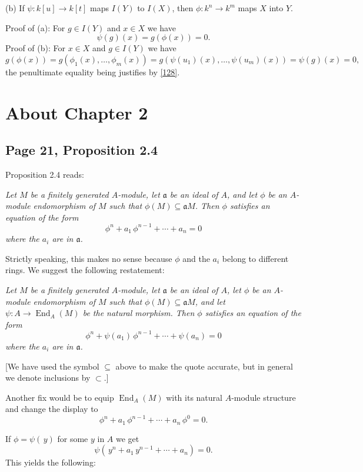 \documentclass[parskip=half,fontsize=12pt]{scrartcl}%
\newcommand{\oo}{\operatorname}\newcommand{\ooo}{\operatorname*}
\newcommand{\mf}{\mathfrak}
\newcommand{\aaa}{\mf a}
\begin{document}
(b) If $\psi:k[u]\to k[t]$ maps $I(Y)$ to $I(X)$, then $\phi:k^n\to k^m$ maps $X$ into $Y$. 

Proof of (a): For $g\in I(Y)$ and $x\in X$ we have 
$$
\psi(g)(x)=g(\phi(x))=0.
$$ 
Proof of (b): For $x\in X$ and $g\in I(Y)$ we have 
$$
g(\phi(x))=g(\phi_1(x),\dots,\phi_m(x))=g(\psi(u_1)(x),\dots,\psi(u_m)(x))=\psi(g)(x)=0,
$$ 
the penultimate equality being justifies by \eqref{128}.


\section{About Chapter 2}%

\subsection{Page 21, Proposition 2.4}\label{24}%

Proposition 2.4 reads:

\emph{Let $M$ be a finitely generated $A$-module, let $\mf a$ be an ideal of $A$, and let $\phi$ be an $A$-module endomorphism of $M$ such that $\phi(M)\subseteq\aaa M$. Then $\phi$ satisfies an equation of the form
$$
\phi^n+a_1\,\phi^{n-1}+\cdots+a_n=0
$$ 
where the $a_i$ are in $\mf a$.}

Strictly speaking, this makes no sense because $\phi$ and the $a_i$ belong to different rings. We suggest the following restatement:

\emph{Let $M$ be a finitely generated $A$-module, let $\aaa$ be an ideal of $A$, let $\phi$ be an $A$-module endomorphism of $M$ such that $\phi(M)\subseteq\aaa M$, and let $\psi:A\to\oo{End}_A(M)$ be the natural morphism. Then $\phi$ satisfies an equation of the form
$$
\phi^n+\psi(a_1)\,\phi^{n-1}+\cdots+\psi(a_n)=0
$$ 
where the $a_i$ are in $\aaa$.}

[We have used the symbol $\subseteq$ above to make the quote accurate, but in general we denote inclusions by $\subset$.]

Another fix would be to equip $\operatorname{End}_A(M)$ with its natural $A$-module structure and change the display to 
$$
\phi^n+a_1\,\phi^{n-1}+\cdots+a_n\,\phi^0=0.
$$

If $\phi=\psi(\,y)$ for some $y$ in $A$ we get 
\begin{equation}\label{2124}
\psi(\,y^n+a_1\,y^{n-1}+\cdots+a_n)=0.
\end{equation}
This yields the following:
\end{document}
